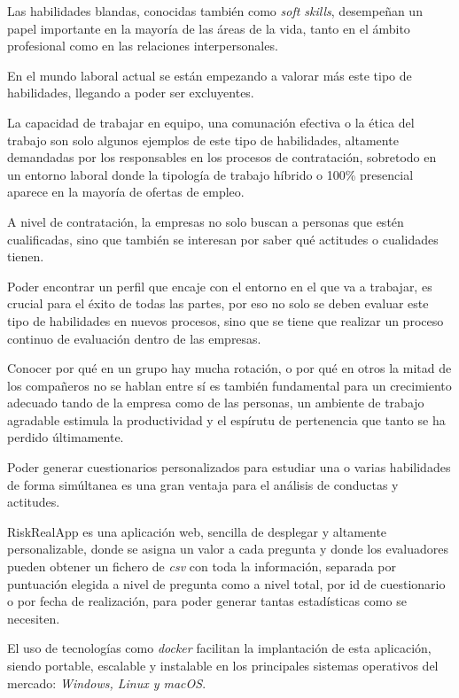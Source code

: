 
Las habilidades blandas, conocidas también como \textit{soft skills}, desempeñan un papel importante en la mayoría de las áreas de la vida, tanto en el ámbito profesional como en las relaciones interpersonales.

En el mundo laboral actual se están empezando a valorar más este tipo de habilidades, llegando a poder ser excluyentes. 

La capacidad de trabajar en equipo, una comunación efectiva o la ética del trabajo son solo algunos ejemplos de este tipo de habilidades, altamente demandadas por los responsables en los procesos de contratación, sobretodo en un entorno laboral donde la tipología de trabajo híbrido o 100\% presencial aparece en la mayoría de ofertas de empleo.

A nivel de contratación, la empresas no solo buscan a personas que estén cualificadas, sino que también se interesan por saber qué actitudes o cualidades tienen.

Poder encontrar un perfil que encaje con el entorno en el que va a trabajar, es crucial para el éxito de todas las partes, por eso no solo se deben evaluar este tipo de habilidades en nuevos procesos, sino que se tiene que realizar un proceso continuo de evaluación dentro de las empresas.

Conocer por qué en un grupo hay mucha rotación, o por qué en otros la mitad de los compañeros no se hablan entre sí es también fundamental para un crecimiento adecuado tando de la empresa como de las personas, un ambiente de trabajo agradable estimula la productividad y el espírutu de pertenencia que tanto se ha perdido últimamente.

Poder generar cuestionarios personalizados para estudiar una o varias habilidades de forma simúltanea es una gran ventaja para el análisis de conductas y actitudes.

RiskRealApp es una aplicación web, sencilla de desplegar y altamente personalizable, donde se asigna un valor a cada pregunta y donde los evaluadores pueden obtener un fichero de \textit{csv} con toda la información, separada por puntuación elegida a nivel de pregunta como a nivel total, por id de cuestionario o por fecha de realización, para poder generar tantas estadísticas como se necesiten.

El uso de tecnologías como \textit{docker} facilitan la implantación de esta aplicación, siendo portable, escalable y instalable en los principales sistemas operativos del mercado: \textit{Windows, Linux y macOS}.

